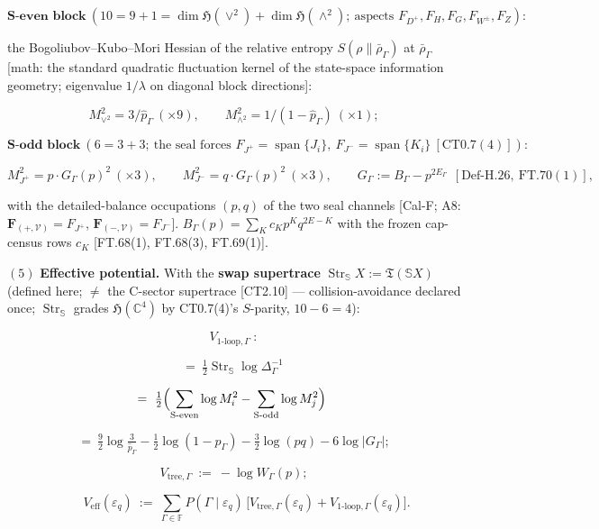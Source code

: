 \begin{definition}
\[
\textbf{S-even block}\ (10=9+1=\dim\mathfrak H(\vee^2)+\dim\mathfrak H(\wedge^2);\ \text{aspects }F_{D^+},F_H,F_G,F_{W^\pm},F_Z):
\]

the Bogoliubov–Kubo–Mori Hessian of the relative entropy $S(\rho\|\bar\rho_\Gamma)$ at $\bar\rho_\Gamma$ [math: the standard quadratic fluctuation kernel of the state-space information geometry; eigenvalue $1/\lambda$ on diagonal block directions]:

\[
M^2_{\vee^2}=3/\hat p_\Gamma\ (\times 9),\qquad M^2_{\wedge^2}=1/(1-\hat p_\Gamma)\ (\times 1);
\]

\[
\textbf{S-odd block}\ (6=3+3;\ \text{the seal forces }F_{J^+}=\operatorname{span}\{J_i\},\ F_{J^-}=\operatorname{span}\{K_i\}\ [\mathrm{CT0.7}(4)]):
\]

\[
M^2_{J^+}=p\cdot G_\Gamma(p)^2\ (\times 3),\qquad M^2_{J^-}=q\cdot G_\Gamma(p)^2\ (\times 3),\qquad G_\Gamma:=B_\Gamma-p^{2E_\Gamma}\ \ [\mathrm{Def\text{-}H.26},\ \mathrm{FT.70}(1)],
\]

with the detailed-balance occupations $(p,q)$ of the two seal channels [Cal-F; A8: $\mathbf F_{(+,\mathcal V)}=F_{J^+}$, $\mathbf F_{(-,\mathcal V)}=F_{J^-}$]. $B_\Gamma(p)=\sum_K c_Kp^Kq^{2E-K}$ with the frozen cap-census rows $c_K$ [FT.68(1), FT.68(3), FT.69(1)].

$(5)$ \textbf{Effective potential.} With the \textbf{swap supertrace} $\operatorname{Str}_{\mathbb S}X:=\mathfrak T(\mathbb S X)$ (defined here; $\ne$ the C-sector supertrace [CT2.10] — collision-avoidance declared once; $\operatorname{Str}_{\mathbb S}$ grades $\mathfrak H(\mathbb C^4)$ by CT0.7(4)'s $S$-parity, $10-6=4$):

\[
V_{\text{1-loop},\Gamma}\ :
\]

\[
= \ \tfrac12\operatorname{Str}_{\mathbb S}\log\Delta^{-1}_\Gamma\
\]

\[
= \ \tfrac12\Bigl(\sum_{\text{S-even}}\log M^2_i-\sum_{\text{S-odd}}\log M^2_j\Bigr)
\
\]

\[
= \ \tfrac92\log\tfrac3{\hat p_\Gamma}-\tfrac12\log(1-\hat p_\Gamma)-\tfrac32\log(pq)-6\log|G_\Gamma|;
\]

\[
V_{\text{tree},\Gamma}\ :=\ -\log W_\Gamma(p);
\]

\[
\qquad V_{\mathrm{eff}}(\varepsilon_q)\ :=\ \sum_{\Gamma\in\mathbb F}P(\Gamma\mid\varepsilon_q)\,\bigl[V_{\text{tree},\Gamma}(\varepsilon_q)+V_{\text{1-loop},\Gamma}(\varepsilon_q)\bigr].
\]


\end{definition}
